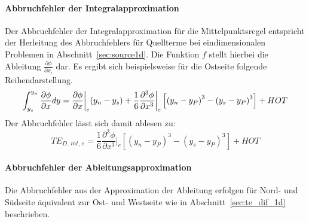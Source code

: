 \paragraph{Abbruchfehler der Integralapproximation}
\noindent Der Abbruchfehler der Integralapproximation für die Mittelpunktsregel entspricht
der Herleitung des Abbruchfehlers für Quellterme bei eindimensionalen
Problemen in Abschnitt~\ref{sec:source1d}. Die Funktion $f$ stellt hierbei die Ableitung
$\frac{\partial \phi}{\partial x_i}$ dar. Es ergibt sich beispielsweise für
die Ostseite folgende Reihendarstellung.
\begin{equation}
  \int_{y_s}^{y_n} \pder[\phi]{x} dy = \pder[\phi]{x}\bigg\vert_e(y_n-y_s)
    + \frac{1}{6} \frac{\partial^3\phi}{\partial x^3}\bigg\vert_e
    \left[{{(y_n-y_P)}^3-{(y_s-y_P)}^3}\right] + HOT
\end{equation}
Der Abbruchfehler lässt sich damit ablesen zu:
\begin{equation}
  TE_{D,\,int,\,e} = \frac{1}{6} \frac{\partial^3\phi}{\partial x^3}\bigg\vert_e
    \left[{{(y_n-y_P)}^3-{(y_s-y_P)}^3}\right] + HOT
\end{equation}
\paragraph{Abbruchfehler der Ableitungsapproximation}
\noindent Die Abbruchfehler aus der Approximation der Ableitung erfolgen für Nord- und Südseite äquivalent
zur Ost- und Westseite wie in Abschnitt~\ref{sec:te_dif_1d} beschrieben.

